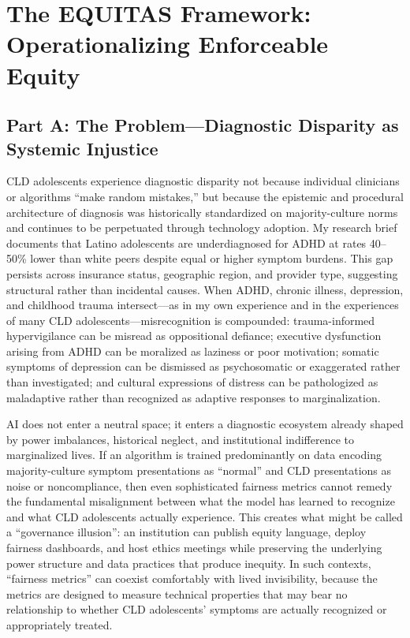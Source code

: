 \documentclass[12pt,letterpaper]{article}
\begin{document}
\section{The EQUITAS Framework: Operationalizing Enforceable Equity}

\subsection{Part A: The Problem---Diagnostic Disparity as Systemic Injustice}

CLD adolescents experience diagnostic disparity not because individual clinicians or algorithms ``make random mistakes,'' but because the epistemic and procedural architecture of diagnosis was historically standardized on majority-culture norms and continues to be perpetuated through technology adoption.\cite{garcia_ed415} My research brief documents that Latino adolescents are underdiagnosed for ADHD at rates 40--50\% lower than white peers despite equal or higher symptom burdens.\cite{garcia_ed415} This gap persists across insurance status, geographic region, and provider type, suggesting structural rather than incidental causes. When ADHD, chronic illness, depression, and childhood trauma intersect---as in my own experience and in the experiences of many CLD adolescents---misrecognition is compounded: trauma-informed hypervigilance can be misread as oppositional defiance; executive dysfunction arising from ADHD can be moralized as laziness or poor motivation; somatic symptoms of depression can be dismissed as psychosomatic or exaggerated rather than investigated; and cultural expressions of distress can be pathologized as maladaptive rather than recognized as adaptive responses to marginalization.\cite{garcia_ed415}

AI does not enter a neutral space; it enters a diagnostic ecosystem already shaped by power imbalances, historical neglect, and institutional indifference to marginalized lives. If an algorithm is trained predominantly on data encoding majority-culture symptom presentations as ``normal'' and CLD presentations as noise or noncompliance, then even sophisticated fairness metrics cannot remedy the fundamental misalignment between what the model has learned to recognize and what CLD adolescents actually experience.\cite{marko2025} This creates what might be called a ``governance illusion'': an institution can publish equity language, deploy fairness dashboards, and host ethics meetings while preserving the underlying power structure and data practices that produce inequity.\cite{munn_idai700} In such contexts, ``fairness metrics'' can coexist comfortably with lived invisibility, because the metrics are designed to measure technical properties that may bear no relationship to whether CLD adolescents' symptoms are actually recognized or appropriately treated.\cite{marko2025}
\end{document}
